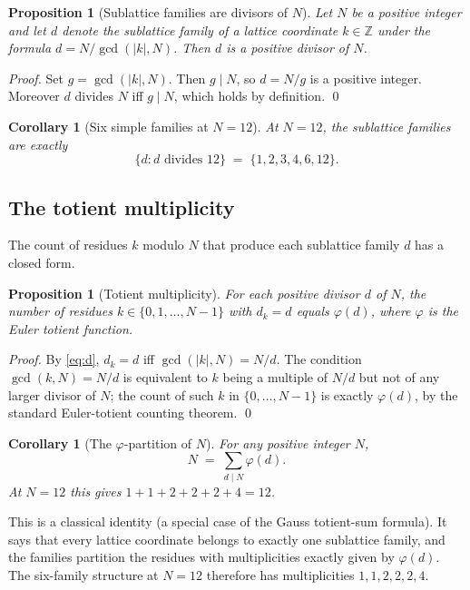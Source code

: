 \documentclass[11pt,a4paper]{article}
\newtheorem{corollary}[theorem]{Corollary}
\newtheorem{proposition}[theorem]{Proposition}
\theoremstyle{definition}
\theoremstyle{remark}
\newcommand{\Z}{\mathbb{Z}}
\begin{document}
\begin{proposition}[Sublattice families are divisors of $N$]\label{prop:divisors}
Let $N$ be a positive integer and let $d$ denote the sublattice family of a lattice coordinate $k\in\Z$ under the formula $d=N/\gcd(|k|,N)$. Then $d$ is a positive divisor of $N$.
\end{proposition}

\begin{proof}
Set $g=\gcd(|k|,N)$. Then $g\mid N$, so $d = N/g$ is a positive integer. Moreover $d$ divides $N$ iff $g\mid N$, which holds by definition. \qed
\end{proof}

\begin{corollary}[Six simple families at $N=12$]\label{cor:six}
At $N=12$, the sublattice families are exactly
\[
\bigl\{d : d\text{ divides }12\bigr\} \;=\; \{1,2,3,4,6,12\}.
\]
\end{corollary}

\subsection{The totient multiplicity}

The count of residues $k$ modulo $N$ that produce each sublattice family $d$ has a closed form.

\begin{proposition}[Totient multiplicity]\label{prop:totient}
For each positive divisor $d$ of $N$, the number of residues $k\in\{0,1,\ldots,N-1\}$ with $d_{k}=d$ equals $\varphi(d)$, where $\varphi$ is the Euler totient function.
\end{proposition}

\begin{proof}
By \eqref{eq:d}, $d_{k}=d$ iff $\gcd(|k|,N)=N/d$. The condition $\gcd(k,N)=N/d$ is equivalent to $k$ being a multiple of $N/d$ but not of any larger divisor of $N$; the count of such $k$ in $\{0,\ldots,N-1\}$ is exactly $\varphi(d)$, by the standard Euler-totient counting theorem. \qed
\end{proof}

\begin{corollary}[The $\varphi$-partition of $N$]\label{cor:totientpartition}
For any positive integer $N$,
\[
N \;=\; \sum_{d\mid N}\varphi(d).
\]
At $N=12$ this gives $1+1+2+2+2+4=12$.
\end{corollary}

This is a classical identity (a special case of the Gauss totient-sum formula). It says that every lattice coordinate belongs to exactly one sublattice family, and the families partition the residues with multiplicities exactly given by $\varphi(d)$. The six-family structure at $N=12$ therefore has multiplicities $1,1,2,2,2,4$.
\end{document}
